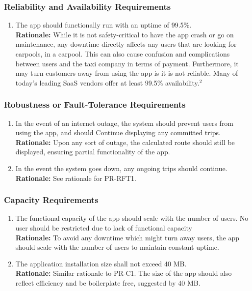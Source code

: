 \documentclass[]{article}
\begin{document}
\subsubsection{Reliability and Availability Requirements}
\label{ssub:reliability_and_availability_requirements}
\begin{enumerate}[{PR-RA}1. ]
	\item The app should functionally run with an uptime of 99.5\%.\\
	{\bf Rationale:} While it is not safety-critical to have the app crash or go on maintenance, any downtime directly affects any users that are looking for carpools, in a carpool. This can also cause confusion and complications between users and the taxi company in terms of payment. Furthermore, it may turn customers away from using the app is it is not reliable. Many of today's leading SaaS vendors offer at least 99.5\% availability.$^2$
\end{enumerate}

\subsubsection{Robustness or Fault-Tolerance Requirements}
\label{ssub:robustness_or_fault_tolerance_requirements}
\begin{enumerate}[{PR-RFT}1. ]
	\item In the event of an internet outage, the system should prevent users from using the app, and should Continue displaying any committed trips.\\
	{\bf Rationale:} Upon any sort of outage, the calculated route should still be displayed, ensuring partial functionality of the app.
	\item In the event the system goes down, any ongoing trips should continue.\\
	{\bf Rationale:} See rationale for PR-RFT1.
\end{enumerate}

\subsubsection{Capacity Requirements}
\label{ssub:capacity_requirements}
\begin{enumerate}[{PR-C}1. ]
	\item The functional capacity of the app should scale with the number of users. No user should be restricted due to lack of functional capacity\\
	{\bf Rationale:} To avoid any downtime which might turn away users, the app should scale with the number of users to maintain constant uptime.
	\item The application installation size shall not exceed 40 MB.\\
	{\bf Rationale:} Similar rationale to PR-C1. The size of the app should also reflect efficiency and be boilerplate free, suggested by 40 MB.
\end{enumerate}
\end{document}
